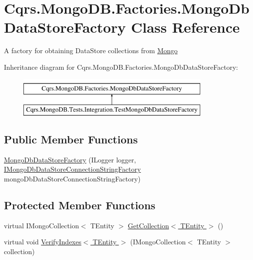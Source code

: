 \hypertarget{classCqrs_1_1MongoDB_1_1Factories_1_1MongoDbDataStoreFactory}{}\section{Cqrs.\+Mongo\+D\+B.\+Factories.\+Mongo\+Db\+Data\+Store\+Factory Class Reference}
\label{classCqrs_1_1MongoDB_1_1Factories_1_1MongoDbDataStoreFactory}


A factory for obtaining Data\+Store collections from \hyperlink{namespaceCqrs_1_1Mongo}{Mongo}  


Inheritance diagram for Cqrs.\+Mongo\+D\+B.\+Factories.\+Mongo\+Db\+Data\+Store\+Factory\+:\begin{figure}[H]
\begin{center}
\leavevmode
\includegraphics[height=2.000000cm]{classCqrs_1_1MongoDB_1_1Factories_1_1MongoDbDataStoreFactory}
\end{center}
\end{figure}
\subsection*{Public Member Functions}
\begin{DoxyCompactItemize}
\item 
\hyperlink{classCqrs_1_1MongoDB_1_1Factories_1_1MongoDbDataStoreFactory_a5306704647ba6dab35844231ca999b7e_a5306704647ba6dab35844231ca999b7e}{Mongo\+Db\+Data\+Store\+Factory} (I\+Logger logger, \hyperlink{interfaceCqrs_1_1MongoDB_1_1Factories_1_1IMongoDbDataStoreConnectionStringFactory}{I\+Mongo\+Db\+Data\+Store\+Connection\+String\+Factory} mongo\+Db\+Data\+Store\+Connection\+String\+Factory)
\end{DoxyCompactItemize}
\subsection*{Protected Member Functions}
\begin{DoxyCompactItemize}
\item 
virtual I\+Mongo\+Collection$<$ T\+Entity $>$ \hyperlink{classCqrs_1_1MongoDB_1_1Factories_1_1MongoDbDataStoreFactory_ab1b732065a4369b09851119969a4815f_ab1b732065a4369b09851119969a4815f}{Get\+Collection$<$ T\+Entity $>$} ()
\item 
virtual void \hyperlink{classCqrs_1_1MongoDB_1_1Factories_1_1MongoDbDataStoreFactory_a1be5e7f0670e120c5105ff96d9ce9f82_a1be5e7f0670e120c5105ff96d9ce9f82}{Verify\+Indexes$<$ T\+Entity $>$} (I\+Mongo\+Collection$<$ T\+Entity $>$ collection)
\end{DoxyCompactItemize}
